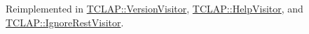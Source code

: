 Reimplemented in \hyperlink{class_t_c_l_a_p_1_1_version_visitor_a30b0d5bd22ac41364d027b94bded4fc0}{T\+C\+L\+A\+P\+::\+Version\+Visitor}, \hyperlink{class_t_c_l_a_p_1_1_help_visitor_a157294efe254edb2b713b7c458aad3f2}{T\+C\+L\+A\+P\+::\+Help\+Visitor}, and \hyperlink{class_t_c_l_a_p_1_1_ignore_rest_visitor_ac2a054ed72b16608a32021c65a600722}{T\+C\+L\+A\+P\+::\+Ignore\+Rest\+Visitor}.

